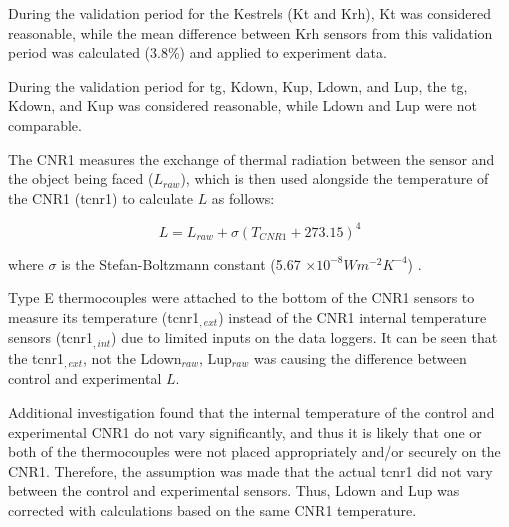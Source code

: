 \documentclass[final,3p,times,authoryear]{elsarticle}
\begin{document}
During the validation period for the Kestrels (\gls{Kt} and \gls{Krh}), \gls{Kt} was considered reasonable, while the mean difference between \gls{Krh} sensors from this validation period was calculated (3.8\%) and applied to experiment data.



During the validation period for \gls{tg}, \gls{Kdown}, \gls{Kup}, \gls{Ldown}, and \gls{Lup}, the \gls{tg}, \gls{Kdown}, and \gls{Kup} was considered reasonable, while \gls{Ldown} and \gls{Lup} were not comparable.


The CNR1 measures the exchange of thermal radiation between the sensor and the object being faced ($L_{raw}$), which is then used alongside the temperature of the CNR1 (\gls{tcnr1}) to calculate $L$ as follows:

\begin{equation}
L = L_{raw} + \sigma (T_{CNR1} + 273.15)^{4}
\label{eq:7.3} 
\end{equation}

where $\sigma$ is the Stefan-Boltzmann constant (5.67 $\times 10^{-8} Wm^{-2}K^{-4}$) \citep{CampbellScientific2011}.

Type E thermocouples were attached to the bottom of the CNR1 sensors to measure its temperature (\gls{tcnr1}$_{,ext}$) instead of the CNR1 internal temperature sensors (\gls{tcnr1}$_{,int}$) due to limited inputs on the data loggers. It can be seen that the \gls{tcnr1}$_{,ext}$, not the \gls{Ldown}$_{raw}$, \gls{Lup}$_{raw}$ was causing the difference between control and experimental $L$. 

Additional investigation found that the internal temperature of the control and experimental CNR1 do not vary significantly, and thus it is likely that one or both of the thermocouples were not placed appropriately and/or securely on the CNR1. Therefore, the assumption was made that the actual \gls{tcnr1} did not vary between the control and experimental sensors. Thus, \gls{Ldown} and \gls{Lup} was corrected with calculations based on the same CNR1 temperature.
\end{document}
